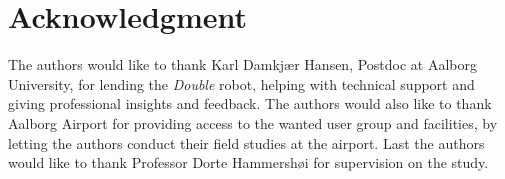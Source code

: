 \section*{Acknowledgment}
\label{Acknowledgment}
%
The authors would like to thank Karl Damkjær Hansen, Postdoc at Aalborg University, for lending the \textit{Double} robot, helping with technical support and giving professional insights and feedback.
The authors would also like to thank Aalborg Airport for providing access to the wanted user group and facilities, by letting the authors conduct their field studies at the airport. Last the authors would like to thank Professor Dorte Hammershøi for supervision on the study. 